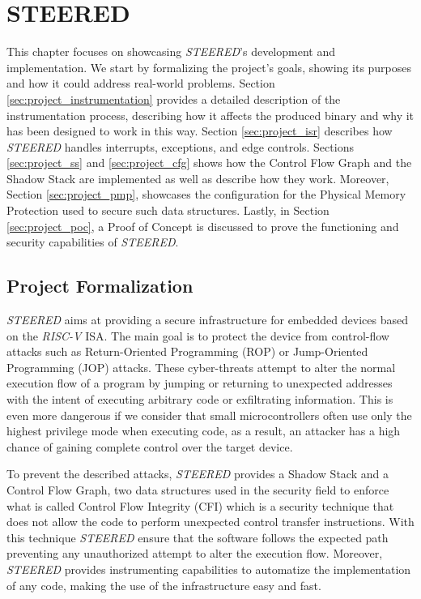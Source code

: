 \chapter{STEERED}
\label{cha:project}

This chapter focuses on showcasing \textit{STEERED}'s development and implementation.
We start by formalizing the project's goals, showing its purposes and how it could
address real-world problems. Section \ref{sec:project_instrumentation} provides
a detailed description of the instrumentation process, describing how it affects
the produced binary and why it has been designed to work in this way. Section
\ref{sec:project_isr} describes how \textit{STEERED} handles interrupts,
exceptions, and edge controls. Sections \ref{sec:project_ss} and
\ref{sec:project_cfg} shows how the Control Flow Graph and the Shadow Stack are
implemented as well as describe how they work. Moreover, Section
\ref{sec:project_pmp}, showcases the configuration for the Physical Memory Protection
used to secure such data structures. Lastly, in Section \ref{sec:project_poc}, a
Proof of Concept is discussed to prove the functioning and security capabilities
of \textit{STEERED}.

\section{Project Formalization}
\label{sec:project_formalization}

\textit{STEERED} aims at providing a secure infrastructure for embedded devices based
on the \textit{RISC-V} ISA. The main goal is to protect the device from control-flow
attacks such as Return-Oriented Programming (ROP) or Jump-Oriented Programming (JOP)
attacks. These cyber-threats attempt to alter the normal execution flow of a
program by jumping or returning to unexpected addresses with the intent of
executing arbitrary code or exfiltrating information. This is even more dangerous
if we consider that small microcontrollers often use only the highest privilege mode
when executing code, as a result, an attacker has a high chance of gaining complete
control over the target device.

To prevent the described attacks, \textit{STEERED} provides a Shadow Stack and a
Control Flow Graph, two data structures used in the security field to enforce
what is called Control Flow Integrity (CFI) which is a security technique that
does not allow the code to perform unexpected control transfer instructions. With
this technique \textit{STEERED} ensure that the software follows the expected
path preventing any unauthorized attempt to alter the execution flow. Moreover,
\textit{STEERED} provides instrumenting capabilities to automatize the implementation
of any code, making the use of the infrastructure easy and fast.

